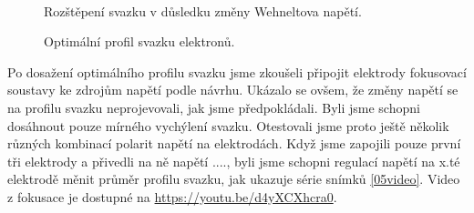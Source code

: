 \begin{figure}[h!]
\begin{minipage}[c]{200pt}
\end{minipage}
\\
\begin{minipage}[c]{200pt}
\caption[Dva svazky]{Rozštěpení svazku v důsledku změny Wehneltova napětí.}
\label{05dvaSvazky}
\end{minipage}
\begin{minipage}[c]{5pt}
\end{minipage}
\vspace{0.1cm}
\begin{minipage}[c]{200pt}
\caption[Optimum]{Optimální profil svazku elektronů.}
\label{05optimum}
\end{minipage}
\end{figure}

Po dosažení optimálního profilu svazku jsme zkoušeli připojit elektrody fokusovací soustavy ke zdrojům napětí podle návrhu. Ukázalo se ovšem, že změny napětí se na profilu svazku neprojevovali, jak jsme předpokládali. Byli jsme schopni dosáhnout pouze mírného vychýlení svazku. Otestovali jsme proto ještě několik různých kombinací polarit napětí na elektrodách. Když jsme zapojili pouze první tři elektrody a přivedli na ně napětí ...., byli jsme schopni regulací napětí na x.té elektrodě měnit průměr profilu svazku, jak ukazuje série snímků \ref{05video}. Video z fokusace je dostupné na \url{https://youtu.be/d4yXCXhcra0}.\\ 

